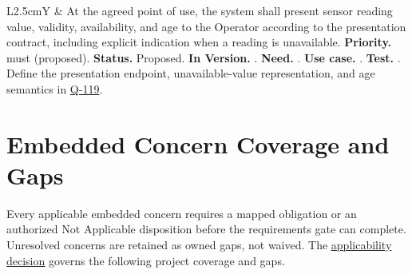 \begin{tabularx}{\linewidth}{L{2.5cm}Y}
 & At the agreed point of use, the system shall present sensor reading value, validity, availability, and age to the Operator according to the presentation contract, including explicit indication when a reading is unavailable. \textbf{Priority.} \gls{must} (proposed). \textbf{Status.} Proposed. \textbf{In Version.} \NoVersion. \textbf{Need.} . \textbf{Use case.} . \textbf{Test.} . Define the presentation endpoint, unavailable-value representation, and age semantics in \hyperref[Question:Q-119]{Q-119}.\\
\end{tabularx}
\normalsize

\section{Embedded Concern Coverage and Gaps}
Every applicable embedded concern requires a mapped obligation or an authorized Not Applicable disposition before the requirements gate can complete. Unresolved concerns are retained as owned gaps, not waived. The \hyperref[Table:ProjectDomainProfiles]{applicability decision} governs the following project coverage and gaps.

